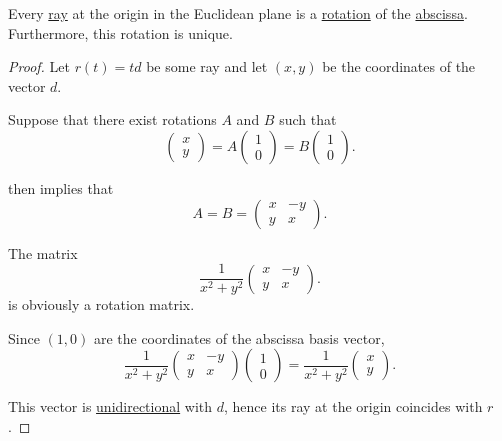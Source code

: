 \begin{proposition}\label{thm:plane_ray_abscissa_rotation}
  Every \hyperref[def:geometric_ray]{ray} at the origin in the Euclidean plane is a \hyperref[def:rigid_motion/rotation]{rotation} of the \hyperref[rem:xyz]{abscissa}. Furthermore, this rotation is unique.
\end{proposition}
\begin{proof}
  Let \( r(t) = td \) be some ray and let \( (x, y) \) be the coordinates of the vector \( d \).

  \UniquenessSubProof Suppose that there exist rotations \( A \) and \( B \) such that
  \begin{equation*}
    \begin{pmatrix} x \\ y \end{pmatrix} = A \begin{pmatrix} 1 \\ 0 \end{pmatrix} = B \begin{pmatrix} 1 \\ 0 \end{pmatrix}.
  \end{equation*}

   then implies that
  \begin{equation*}
    A = B = \begin{pmatrix}
      x & -y \\
      y & x
    \end{pmatrix}.
  \end{equation*}

  \ExistenceSubProof The matrix
  \begin{equation*}
    \frac 1 {x^2 + y^2}
    \begin{pmatrix}
      x & -y \\
      y & x
    \end{pmatrix}.
  \end{equation*}
  is obviously a rotation matrix.

  Since \( (1, 0) \) are the coordinates of the abscissa basis vector,
  \begin{equation*}
    \frac 1 {x^2 + y^2}
    \begin{pmatrix}
      x & -y \\
      y & x
    \end{pmatrix}
    \begin{pmatrix}
      1 \\ 0
    \end{pmatrix}
    =
    \frac 1 {x^2 + y^2}
    \begin{pmatrix}
      x \\ y
    \end{pmatrix}.
  \end{equation*}

  This vector is \hyperref[def:geometric_ray/unidirectional]{unidirectional} with \( d \), hence its ray at the origin coincides with \( r \).
\end{proof}

